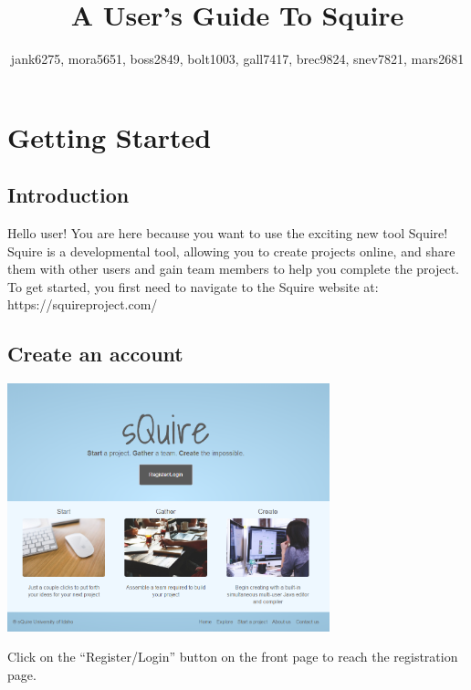 \documentclass[11pt]{report}
\title{A User's Guide To Squire}
\author{jank6275, mora5651, boss2849, bolt1003, gall7417, brec9824, snev7821, mars2681}
\begin{document}
\maketitle

\tableofcontents


\chapter{Getting Started}

\section{Introduction}
Hello user! You are here because you want to use the exciting new tool Squire! Squire is a developmental tool, allowing you to create projects online, and share them with other users and gain team members to help you complete the project. To get started, you first need to navigate to the Squire website at:  https://squireproject.com/

\section{Create an account}
	\begin{center}
           \includegraphics[width=0.7\textwidth]{Frontpage.png}
    \end{center}
Click on the “Register/Login” button on the front page to reach the registration page.
\end{document}
